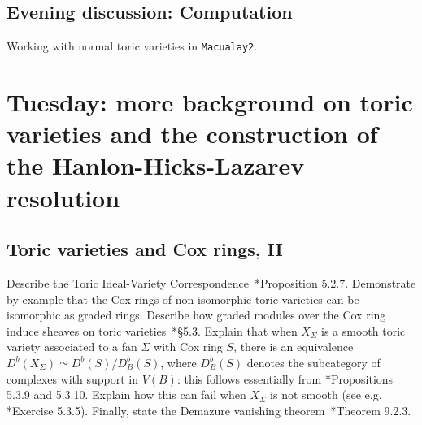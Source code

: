 \documentclass[11pt]{amsart}
\numberwithin{equation}{section}
\theoremstyle{definition}
\theoremstyle{remark}
\newcommand{\PP}{\mathbb P}
\newcommand{\Spec}{\operatorname{Spec}}
\begin{document}











\subsection*{Evening discussion: Computation}  Working with normal toric varieties in {\tt Macualay2}.


\section{Tuesday: more background on toric varieties and the construction of the Hanlon-Hicks-Lazarev resolution}

\subsection{Toric varieties and Cox rings, II}
Describe the Toric Ideal-Variety Correspondence~\cite{CLS}*{Proposition 5.2.7}. Demonstrate by example that the Cox rings of non-isomorphic toric varieties can be isomorphic as graded rings. Describe how graded modules over the Cox ring induce sheaves on toric varieties~\cite{CLS}*{\S 5.3}. Explain that when $X_\Sigma$ is a smooth toric variety associated to a fan $\Sigma$ with Cox ring $S$, there is an equivalence $D^b(X_\Sigma) \simeq D^b(S) / D^b_B(S)$, where $D^b_B(S)$ denotes the subcategory of complexes with support in $V(B)$: this follows essentially from \cite{CLS}*{Propositions 5.3.9 and 5.3.10}. Explain how this can fail when $X_\Sigma$ is not smooth (see e.g. \cite{CLS}*{Exercise 5.3.5}).  %
Finally, state the Demazure vanishing theorem~\cite{CLS}*{Theorem 9.2.3}. 
\end{document}
